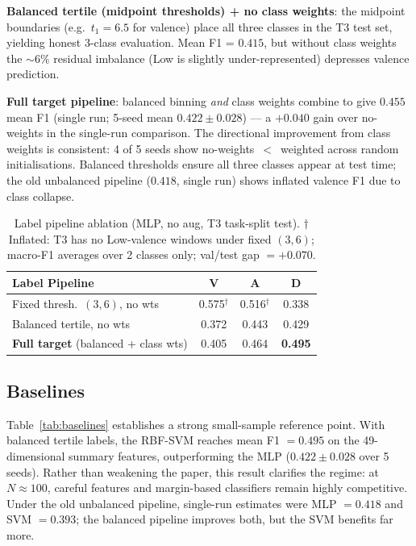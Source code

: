 \documentclass[sigconf,nonacm]{acmart}
\begin{document}
\textbf{Balanced tertile (midpoint thresholds) + no class weights}:
the midpoint boundaries (e.g.\ $t_1 = 6.5$ for valence) place all three
classes in the T3 test set, yielding honest 3-class evaluation.
Mean F1 = $0.415$, but without class weights the $\sim\!6\%$ residual
imbalance (Low is slightly under-represented) depresses valence prediction.

\textbf{Full target pipeline}: balanced binning \emph{and} class weights
combine to give $0.455$ mean F1 (single run; 5-seed mean $0.422 \pm 0.028$)
--- a $+0.040$ gain over no-weights in the single-run comparison.
The directional improvement from class weights is consistent:
4 of 5 seeds show no-weights~$<$~weighted across random initialisations.
Balanced thresholds ensure all three classes appear at test time;
the old unbalanced pipeline ($0.418$, single run) shows inflated valence
F1 due to class collapse.

\begin{table}[t]
\caption{Label pipeline ablation (MLP, no aug, T3 task-split test).
  $\dagger$Inflated: T3 has no Low-valence windows under fixed $(3,6)$;
  macro-F1 averages over 2 classes only; val/test gap $= {+}0.070$.}
\label{tab:label_ablation}
\centering
\setlength{\tabcolsep}{3pt}
\small
\begin{tabular}{lccc}
\toprule
\textbf{Label Pipeline} & \textbf{V} & \textbf{A} & \textbf{D} \\
\midrule
Fixed thresh.\ $(3,6)$, no wts  & 0.575$^\dagger$ & 0.516$^\dagger$ & 0.338 \\
Balanced tertile, no wts        & 0.372 & 0.443 & 0.429 \\
\textbf{Full target} (balanced + class wts) & 0.405 & 0.464 & \textbf{0.495} \\
\bottomrule
\end{tabular}
\end{table}

\subsection{Baselines}

Table~\ref{tab:baselines} establishes a strong small-sample reference point.
With balanced tertile labels, the RBF-SVM reaches mean F1 $= 0.495$ on the
49-dimensional summary features, outperforming the MLP
($0.422 \pm 0.028$ over 5 seeds).
Rather than weakening the paper, this result clarifies the regime:
at $N \approx 100$, careful features and margin-based classifiers remain
highly competitive.
Under the old unbalanced pipeline, single-run estimates were
MLP $= 0.418$ and SVM $= 0.393$; the balanced pipeline improves both,
but the SVM benefits far more.
\end{document}
